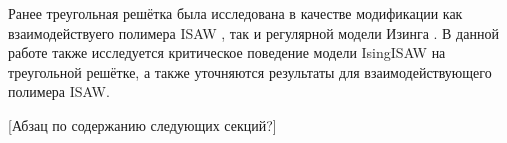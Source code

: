 Ранее треугольная решётка была исследована в качестве модификации как взаимодействуего полимера ISAW \cite{Privman1986}, 
так и регулярной модели Изинга \cite{ShchurTriangle, selke2006critical}. 
В данной работе также исследуется критическое поведение модели IsingISAW на треугольной решётке, а также уточняются результаты для взаимодействующего полимера ISAW.

[Абзац по содержанию следующих секций?]
